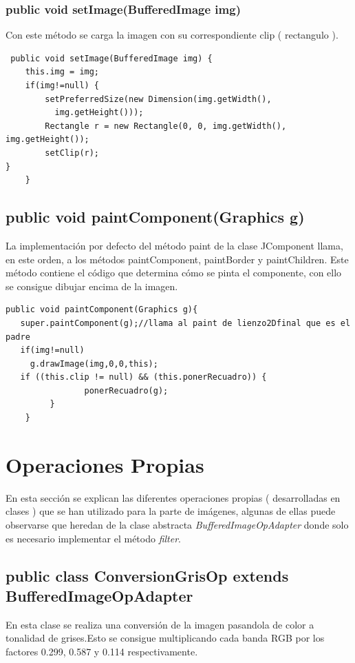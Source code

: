 \subsubsection*{public void setImage(BufferedImage img)}
Con este método se carga la imagen con su correspondiente clip ( rectangulo ).
\begin{lstlisting}
 public void setImage(BufferedImage img) {
    this.img = img;
    if(img!=null) {
        setPreferredSize(new Dimension(img.getWidth(),
          img.getHeight()));        
        Rectangle r = new Rectangle(0, 0, img.getWidth(), img.getHeight());
        setClip(r);
}
    }
\end{lstlisting}

\subsection*{public void paintComponent(Graphics g)}
La implementación por defecto del método paint de la clase JComponent llama, en este orden, a los métodos paintComponent, paintBorder y paintChildren. Este método contiene el código que determina cómo se pinta el componente, con ello se consigue dibujar encima de la imagen.
\begin{lstlisting}
public void paintComponent(Graphics g){
   super.paintComponent(g);//llama al paint de lienzo2Dfinal que es el padre
   if(img!=null)
     g.drawImage(img,0,0,this);
   if ((this.clip != null) && (this.ponerRecuadro)) {
                ponerRecuadro(g);
         }
    }
\end{lstlisting}

\section{Operaciones Propias}
En esta sección se explican las diferentes operaciones propias\cite{apuntestimd} ( desarrolladas en clases ) que se han utilizado para la parte de imágenes, algunas de ellas puede observarse que heredan de la clase abstracta \emph{BufferedImageOpAdapter} donde solo es necesario implementar el método \emph{filter}.

\subsection*{public class ConversionGrisOp extends BufferedImageOpAdapter}
En esta clase se realiza una conversión de la imagen pasandola de color a tonalidad de grises.Esto se consigue multiplicando cada banda RGB por los factores 0.299, 0.587 y 0.114 respectivamente.

